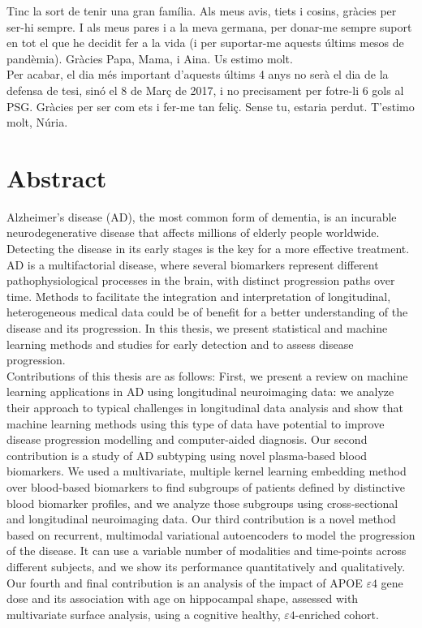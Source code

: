 \documentclass[12pt, b5paper,twoside]{tesi_upf}
\begin{document}
Tinc la sort de tenir una gran família. Als meus avis, tiets i cosins, gràcies per ser-hi sempre. I als meus pares i a la meva germana, per donar-me sempre suport en tot el que he decidit fer a la vida (i per suportar-me aquests últims mesos de pandèmia). Gràcies Papa, Mama, i Aina. Us estimo molt. \\

Per acabar, el dia més important d'aquests últims 4 anys no serà el dia de la defensa de tesi, sinó el 8 de Març de 2017, i no precisament per fotre-li 6 gols al PSG. Gràcies per ser com ets i fer-me tan feliç. Sense tu, estaria perdut. T'estimo molt, Núria. \\

\cleardoublepage


\section*{\Large \sffamily Abstract}
Alzheimer's disease (AD), the most common form of dementia, is an incurable neurodegenerative disease that affects millions of elderly people worldwide. Detecting the disease in its early stages is the key for a more effective treatment. AD is a multifactorial disease, where several biomarkers represent different pathophysiological processes in the brain, with distinct progression paths over time. Methods to facilitate the integration and interpretation of longitudinal, heterogeneous medical data could be of benefit for a better understanding of the disease and its progression. In this thesis, we present statistical and machine learning methods and studies for early detection and to assess disease progression. \\

Contributions of this thesis are as follows: First, we present a review on machine learning applications in AD using longitudinal neuroimaging data: we analyze their approach to typical challenges in longitudinal data analysis and show that machine learning methods using this type of data have potential to improve disease progression modelling and computer-aided diagnosis. Our second contribution is a study of AD subtyping using novel plasma-based blood biomarkers. We used a multivariate, multiple kernel learning embedding method over blood-based biomarkers to find subgroups of patients defined by distinctive blood biomarker profiles, and we analyze those subgroups using cross-sectional and longitudinal neuroimaging data. Our third contribution is a novel method based on recurrent, multimodal variational autoencoders to model the progression of the disease. It can use a variable number of modalities and time-points across different subjects, and we show its performance quantitatively and qualitatively. Our fourth and final contribution is an analysis of the impact of APOE $\varepsilon4$ gene dose and its association with age on hippocampal shape, assessed with multivariate surface analysis, using a cognitive healthy, $\varepsilon4$-enriched cohort.
\end{document}
